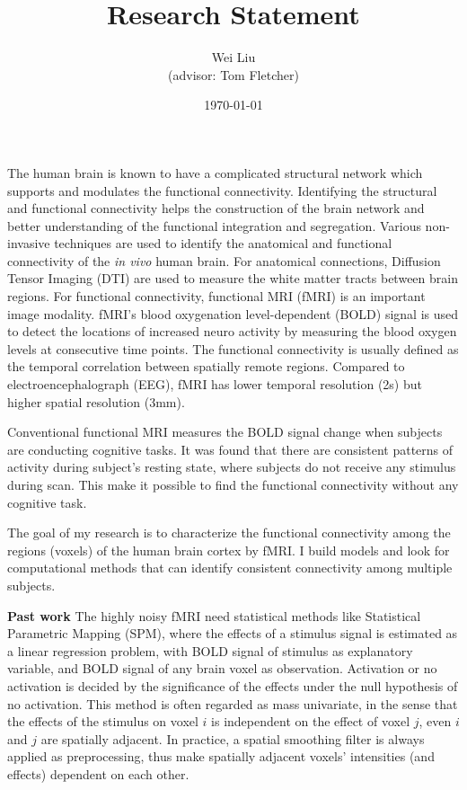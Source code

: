 \documentclass[]{article}
\begin{document}
\title{Research Statement} \author{Wei Liu\\ \small{(advisor: Tom Fletcher)} }
\date{\today} \maketitle The human brain is known to have a complicated
structural network which supports and modulates the functional
connectivity. Identifying the structural and functional connectivity helps the
construction of the brain network and better understanding of the functional
integration and segregation. Various non-invasive techniques are used to
identify the anatomical and functional connectivity of the \emph{in vivo} human
brain. For anatomical connections, Diffusion Tensor Imaging (DTI) are used to
measure the white matter tracts between brain regions. For functional
connectivity, functional MRI (fMRI) is an important image modality. fMRI's blood
oxygenation level-dependent (BOLD) signal is used to detect the locations of increased
neuro activity by measuring the blood oxygen levels at consecutive time
points. The functional connectivity is usually defined as the temporal
correlation between spatially remote regions. Compared to electroencephalograph
(EEG), fMRI has lower temporal resolution (2s) but higher spatial resolution
(3mm).

Conventional functional MRI measures the BOLD signal change when subjects are
conducting cognitive tasks. It was found \cite{raichle2001} that there are consistent
patterns of activity during subject's resting state, where subjects do not
receive any stimulus during scan. This make it possible to find the functional
connectivity without any cognitive task.

The goal of my research is to characterize the functional connectivity among the
regions (voxels) of the human brain cortex by fMRI. I build models and look for 
computational methods that can identify consistent connectivity among multiple
subjects.

\textbf{Past work} The highly noisy fMRI need statistical methods like
Statistical Parametric Mapping (SPM), where the effects of a stimulus signal is
estimated as a linear regression problem, with BOLD signal of stimulus as
explanatory variable, and BOLD signal of any brain voxel as
observation. Activation or no activation is decided by the significance of the
effects under the null hypothesis of no activation. This method is often
regarded as mass univariate, in the sense that the effects of the stimulus on
voxel $i$ is independent on the effect of voxel $j$, even $i$ and $j$ are
spatially adjacent. In practice, a spatial smoothing filter is always applied as
preprocessing, thus make spatially adjacent voxels' intensities (and effects)
dependent on each other.
\end{document}
